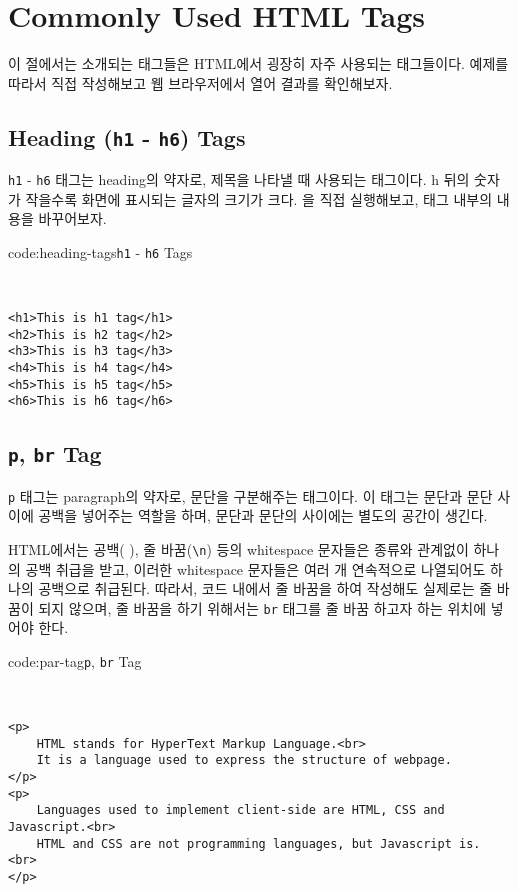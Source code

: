 \section{Commonly Used HTML Tags} \label{sect:commonly-used-html-tags}

이 절에서는 소개되는 태그들은 HTML에서 굉장히 자주 사용되는 태그들이다. 예제를 따라서 직접 작성해보고 웹 브라우저에서 열어 결과를 확인해보자.

\subsection*{Heading (\texttt{h1} - \texttt{h6}) Tags}
\texttt{h1} - \texttt{h6} 태그는 heading의 약자로, 제목을 나타낼 때 사용되는 태그이다. h 뒤의 숫자가 작을수록 화면에 표시되는 글자의 크기가 크다. 을 직접 실행해보고, 태그 내부의 내용을 바꾸어보자.

\begin{codeenv}{code:heading-tags}{\texttt{h1} - \texttt{h6} Tags}\begin{verbatim}


<h1>This is h1 tag</h1>
<h2>This is h2 tag</h2>
<h3>This is h3 tag</h3>
<h4>This is h4 tag</h4>
<h5>This is h5 tag</h5>
<h6>This is h6 tag</h6>
\end{verbatim}
\end{codeenv}

\subsection*{\texttt{p}, \texttt{br} Tag}
\texttt{p} 태그는 paragraph의 약자로, 문단을 구분해주는 태그이다. 이 태그는 문단과 문단 사이에 공백을 넣어주는 역할을 하며, 문단과 문단의 사이에는 별도의 공간이 생긴다. 

HTML에서는 공백( ), 줄 바꿈(\verb|\n|) 등의 whitespace 문자들은 종류와 관계없이 하나의 공백 취급을 받고, 이러한 whitespace 문자들은 여러 개 연속적으로 나열되어도 하나의 공백으로 취급된다. 따라서, 코드 내에서 줄 바꿈을 하여 작성해도 실제로는 줄 바꿈이 되지 않으며, 줄 바꿈을 하기 위해서는 \texttt{br} 태그를 줄 바꿈 하고자 하는 위치에 넣어야 한다. 

\begin{codeenv}{code:par-tag}{\texttt{p}, \texttt{br} Tag}\begin{verbatim}


<p>
    HTML stands for HyperText Markup Language.<br>
    It is a language used to express the structure of webpage.
</p>
<p>
    Languages used to implement client-side are HTML, CSS and Javascript.<br>
    HTML and CSS are not programming languages, but Javascript is. <br>
</p>
\end{verbatim}
\end{codeenv}

